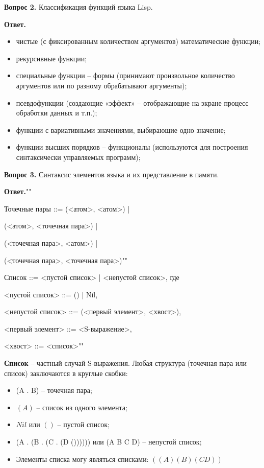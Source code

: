 \documentclass[12pt]{report}
\begin{document}
\textbf{Вопрос 2.} Классификация функций языка Lisp.
	
\textbf{Ответ.} 
	
\begin{itemize}
	\item чистые (с фиксированным количеством аргументов) математические функции;
	\item рекурсивные функции;
	\item специальные функции – формы (принимают произвольное количество аргументов или по разному обрабатывают аргументы);
	\item псевдофункции (создающие «эффект» – отображающие на экране процесс обработки данных и т.п.);
	\item функции с вариативными значениями, выбирающие одно значение;
	\item функции высших порядков – функционалы (используются для построения синтаксически управляемых программ);
\end{itemize}

\textbf{Вопрос 3.} Синтаксис элементов языка и их представление в памяти.


\textbf{Ответ.}""\newline


Точечные пары ::= (<атом>, <атом>) |

(<атом>, <точечная пара>) |

(<точечная пара>, <атом>) |

(<точечная пара>, <точечная пара>)""\newline

\indent Список ::= <пустой список> | <непустой список>, где

<пустой список> ::= () | Nil,

<непустой список> ::= (<первый элемент>, <хвост>),

<первый элемент> ::= <S-выражение>,

<хвост> ::= <список>""\newline


\indent \textbf{Список} -- частный случай S-выражения. Любая структура (точечная пара или список) заключаются в круглые скобки:


\begin{itemize}

	\item (A . B) -- точечная пара;

	\item $(A)$ -- список из одного элемента;

	\item $Nil$ или $()$ -- пустой список;

	\item (A . (B . (C . (D ()))))) или (A B C D) -- непустой список;

	\item Элементы списка могу являться списками: $((A)(B)(CD))$

\end{itemize}
\end{document}

